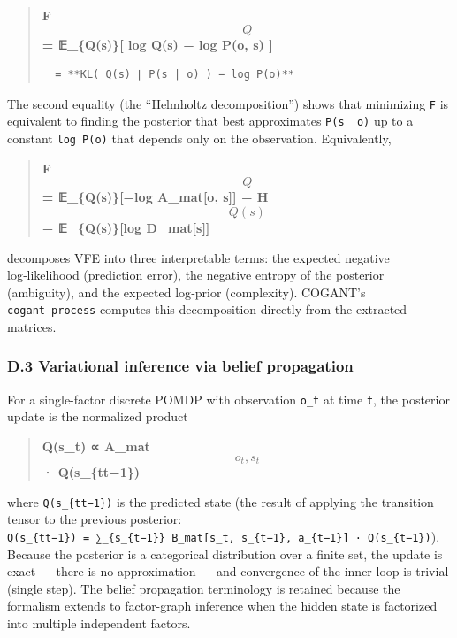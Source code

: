 \documentclass[
]{article}
\begin{document}
\begin{quote}
\textbf{F\[Q\] = 𝔼\_\{Q(s)\}{[} log Q(s) − log P(o, s) {]}}

\begin{verbatim}
  = **KL( Q(s) ∥ P(s | o) ) − log P(o)**
\end{verbatim}
\end{quote}

The second equality (the ``Helmholtz decomposition'') shows that
minimizing \texttt{F} is equivalent to finding the posterior that best
approximates \texttt{P(s\ \mid{}\ o)} up to a constant
\texttt{log\ P(o)} that depends only on the observation. Equivalently,

\begin{quote}
\textbf{F\[Q\] = 𝔼\_\{Q(s)\}{[}−log A\_mat{[}o, s{]}{]} − H\[Q(s)\]
− 𝔼\_\{Q(s)\}{[}log D\_mat{[}s{]}{]}}
\end{quote}

decomposes VFE into three interpretable terms: the expected negative
log‑likelihood (prediction error), the negative entropy of the posterior
(ambiguity), and the expected log‑prior (complexity). COGANT's
\texttt{cogant\ process} computes this decomposition directly from the
extracted matrices.

\subsubsection{D.3 Variational inference via belief
propagation}\label{d.3-variational-inference-via-belief-propagation}

For a single-factor discrete POMDP with observation \texttt{o\_t} at
time \texttt{t}, the posterior update is the normalized product

\begin{quote}
\textbf{Q(s\_t) ∝ A\_mat\[o_t, s_t\] · Q(s\_\{t\mid t−1\})}
\end{quote}

where \texttt{Q(s\_\{t\mid{}t−1\})} is the predicted state (the
result of applying the transition tensor to the previous posterior:
\texttt{Q(s\_\{t\mid{}t−1\})\ =\ ∑\_\{s\_\{t−1\}\}\ B\_mat{[}s\_t,\ s\_\{t−1\},\ a\_\{t−1\}{]}\ ·\ Q(s\_\{t−1\})}).
Because the posterior is a categorical distribution over a finite set,
the update is exact --- there is no approximation --- and convergence of
the inner loop is trivial (single step). The belief propagation
terminology is retained because the formalism extends to factor-graph
inference when the hidden state is factorized into multiple independent
factors.
\end{document}

